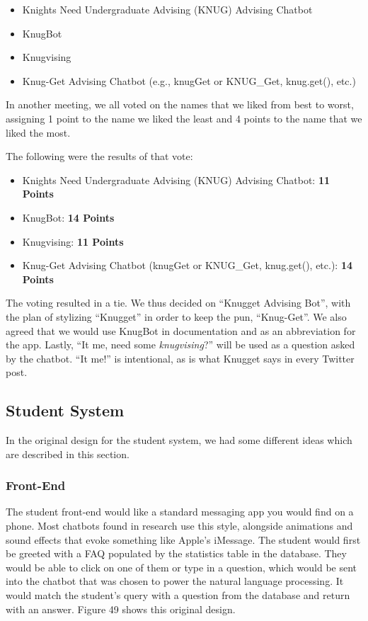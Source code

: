 \documentclass[titlepage, 12pt]{article}
\begin{document}
\begin{itemize}
    \item Knights Need Undergraduate Advising (KNUG) Advising Chatbot
    \item KnugBot
    \item Knugvising
    \item Knug-Get Advising Chatbot (e.g., knugGet or KNUG\_Get, knug.get(), etc.)
\end{itemize}

In another meeting, we all voted on the names that we liked from best to worst, assigning 1 point to the name we liked the least and 4 points to the name that we liked the most.

The following were the results of that vote:

\begin{itemize}
    \item Knights Need Undergraduate Advising (KNUG) Advising Chatbot: \textbf{11 Points}
    \item KnugBot: \textbf{14 Points}
    \item Knugvising: \textbf{11 Points}
    \item Knug-Get Advising Chatbot (knugGet or KNUG\_Get, knug.get(), etc.): \textbf{14 Points}
\end{itemize}

The voting resulted in a tie. We thus decided on “Knugget Advising Bot”, with the plan of stylizing “Knugget” in order to keep the pun, “Knug-Get”. We also agreed that we would use KnugBot in documentation and as an abbreviation for the app. Lastly, “It me, need some \emph{knugvising}?” will be used as a question asked by the chatbot. “It me!” is intentional, as is what Knugget says in every Twitter post.


\subsection{Student System}

In the original design for the student system, we had some different ideas which are described in this section.

\subsubsection{Front-End}

The student front-end would like a standard messaging app you would find on a phone. Most chatbots found in research use this style, alongside animations and sound effects that evoke something like Apple’s iMessage. The student would first be greeted with a FAQ populated by the statistics table in the database. They would be able to click on one of them or type in a question, which would be sent into the chatbot that was chosen to power the natural language processing. It would match the student’s query with a question from the database and return with an answer. Figure 49 shows this original design.
\end{document}
